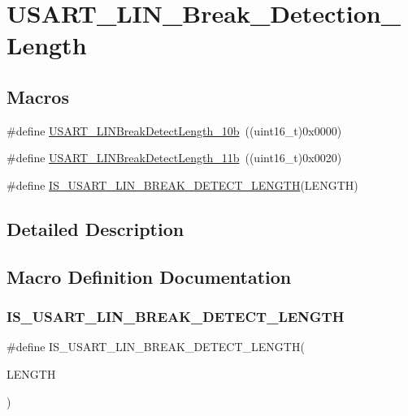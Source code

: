 \hypertarget{group___u_s_a_r_t___l_i_n___break___detection___length}{}\section{U\+S\+A\+R\+T\+\_\+\+L\+I\+N\+\_\+\+Break\+\_\+\+Detection\+\_\+\+Length}
\label{group___u_s_a_r_t___l_i_n___break___detection___length}
\subsection*{Macros}
\begin{DoxyCompactItemize}
\item 
\#define \mbox{\hyperlink{group___u_s_a_r_t___l_i_n___break___detection___length_gacfd0aabae8774239440e828c961ac2a0}{U\+S\+A\+R\+T\+\_\+\+L\+I\+N\+Break\+Detect\+Length\+\_\+10b}}~((uint16\+\_\+t)0x0000)
\item 
\#define \mbox{\hyperlink{group___u_s_a_r_t___l_i_n___break___detection___length_gaf591cfcc859d67d71e6fa594eb5aec16}{U\+S\+A\+R\+T\+\_\+\+L\+I\+N\+Break\+Detect\+Length\+\_\+11b}}~((uint16\+\_\+t)0x0020)
\item 
\#define \mbox{\hyperlink{group___u_s_a_r_t___l_i_n___break___detection___length_gaa7a45d542b1df5da1160777ad4a80d72}{I\+S\+\_\+\+U\+S\+A\+R\+T\+\_\+\+L\+I\+N\+\_\+\+B\+R\+E\+A\+K\+\_\+\+D\+E\+T\+E\+C\+T\+\_\+\+L\+E\+N\+G\+TH}}(L\+E\+N\+G\+TH)
\end{DoxyCompactItemize}


\subsection{Detailed Description}


\subsection{Macro Definition Documentation}
\mbox{\label{group___u_s_a_r_t___l_i_n___break___detection___length_gaa7a45d542b1df5da1160777ad4a80d72}} 
\subsubsection{\texorpdfstring{IS\_USART\_LIN\_BREAK\_DETECT\_LENGTH}{IS\_USART\_LIN\_BREAK\_DETECT\_LENGTH}}
{\footnotesize\ttfamily \#define I\+S\+\_\+\+U\+S\+A\+R\+T\+\_\+\+L\+I\+N\+\_\+\+B\+R\+E\+A\+K\+\_\+\+D\+E\+T\+E\+C\+T\+\_\+\+L\+E\+N\+G\+TH(\begin{DoxyParamCaption}\item[{}]{L\+E\+N\+G\+TH }\end{DoxyParamCaption})}

